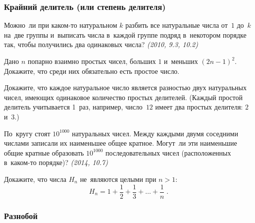 \subsubsection*{Крайний делитель (или степень делителя)}

\begin{problems}

\item
Можно~ли при каком-то натуральном $k$ разбить все натуральные числа
от~$1$ до~$k$ на~две группы и~выписать числа в~каждой группе подряд в~некотором
порядке так, чтобы получились два одинаковых числа?
\emph{(2010, 9.3, 10.2)}

\item
Дано $n$ попарно взаимно простых чисел, больших $1$ и~меньших $(2 n - 1)^{2}$.
Докажите, что среди них обязательно есть простое число.

\item
Докажите, что каждое натуральное число является разностью двух натуральных
чисел, имеющих одинаковое количество простых делителей.
(Каждый простой делитель учитывается 1~раз, например, число~$12$ имеет два
простых делителя: $2$ и~$3$.)

\item
По~кругу стоят $10^{1000}$ натуральных чисел.
Между каждыми двумя соседними числами записали их наименьшее общее кратное.
Могут~ли эти наименьшие общие кратные образовать $10^{1000}$ последовательных
чисел (расположенных в~каком-то порядке)?
\emph{(2014, 10.7)}

\item
Докажите, что числа $H_{n}$ не~являются целыми при $n > 1$:
\[
    H_{n}
=
    1 + \frac{1}{2} + \frac{1}{3} + \ldots + \frac{1}{n}
\;
.
\]

\end{problems}


\subsubsection*{Разнобой}

